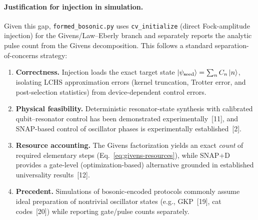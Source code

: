 \documentclass[11pt]{article}
\begin{document}
\paragraph{Justification for injection in simulation.}
Given this gap, \texttt{formed\_bosonic.py} uses \texttt{cv\_initialize} (direct Fock-amplitude injection) for the
Givens/Law--Eberly branch and separately reports the analytic pulse count from the Givens decomposition.
This follows a standard separation-of-concerns strategy:
\begin{enumerate}
\item \textbf{Correctness.} Injection loads the exact target state
  $\ket{\psi_{\mathrm{seed}}}=\sum_n C_n\ket{n}$, isolating LCHS approximation errors
  (kernel truncation, Trotter error, and post-selection statistics) from device-dependent control errors.
\item \textbf{Physical feasibility.} Deterministic resonator-state synthesis with calibrated qubit--resonator control
  has been demonstrated experimentally~[11], and SNAP-based control of oscillator phases is experimentally established~[2].
\item \textbf{Resource accounting.} The Givens factorization yields an exact \emph{count} of required elementary steps
  (Eq.~\eqref{eq:givens-resources}), while SNAP$+$D provides a gate-level (optimization-based) alternative grounded in
  established universality results~[12].
\item \textbf{Precedent.} Simulations of bosonic-encoded protocols commonly assume ideal preparation of nontrivial oscillator states
  (e.g., GKP~[19], cat codes~[20]) while reporting gate/pulse counts separately.
\end{enumerate}
\end{document}
